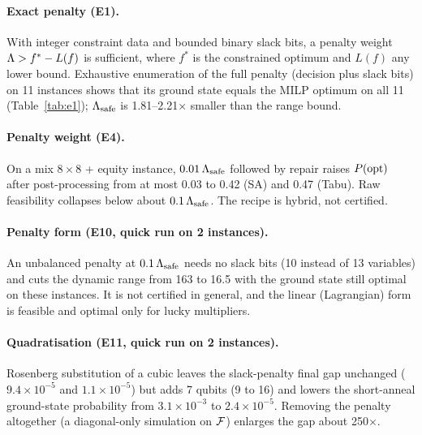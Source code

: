 \paragraph{Exact penalty (E1).} With integer constraint data and bounded binary slack bits, a
penalty weight $\Lambda>f^\ast-L(f)$ is sufficient, where $f^\ast$ is the constrained optimum and
$L(f)$ any lower bound. Exhaustive enumeration of the full penalty \QUBO{} (decision plus slack
bits) on 11 instances shows that its ground state equals the MILP optimum on all 11
(Table~\ref{tab:e1}); $\Lambda_{\mathrm{safe}}$ is 1.81--2.21$\times$ smaller than the range bound.

\paragraph{Penalty weight (E4).} On a mix $8\times8$ + equity instance, $0.01\,\Lambda_{\mathrm{safe}}$ followed
by repair raises $P(\mathrm{opt})$ after post-processing from at most 0.03 to 0.42 (SA) and 0.47 (Tabu).
Raw feasibility collapses below about $0.1\,\Lambda_{\mathrm{safe}}$. The recipe is hybrid, not certified.

\paragraph{Penalty form (E10, quick run on 2 instances).} An unbalanced penalty at $0.1\,\Lambda_{\mathrm{safe}}$
needs no slack bits (10 instead of 13 variables) and cuts the dynamic range from 163 to 16.5 with
the ground state still optimal on these instances. It is not certified in general, and the linear
(Lagrangian) form is feasible and optimal only for lucky multipliers.

\paragraph{Quadratisation (E11, quick run on 2 instances).} Rosenberg substitution
\cite{rosenberg1975,boros2002} of a cubic \HUBO{} leaves the slack-penalty final gap unchanged
($9.4\times10^{-5}$ and $1.1\times10^{-5}$) but adds 7 qubits (9 to 16) and lowers the short-anneal
ground-state probability from $3.1\times10^{-3}$ to $2.4\times10^{-5}$. Removing the penalty
altogether (a diagonal-only simulation on $\mathcal{F}$) enlarges the gap about 250$\times$.
